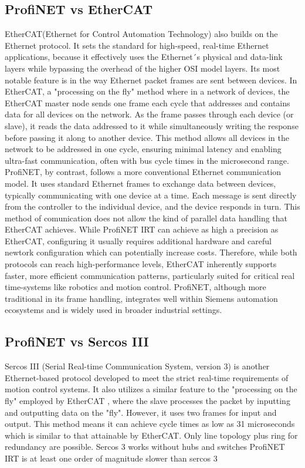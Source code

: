 \documentclass[conference]{IEEEtran}
\begin{document}
\subsection{ProfiNET vs EtherCAT}
EtherCAT(Ethernet for Control Automation Technology) also builds on the Ethernet protocol. It sets the standard for high-speed, real-time Ethernet applications\cite{Rostan2010EtherCAT}, because it effectively uses the Ethernet´s physical and data-link layers while bypassing the overhead of the higher OSI model layers. Its most notable feature is in the way Ethernet packet frames are sent between devices. In EtherCAT, a "processing on the fly" method where in a network of devices, the EtherCAT master node sends one frame each cycle that addresses and contains data for all devices on the network. As the frame passes through each device (or slave), it reads the data addressed to it while simultaneously writing the response before passing it along to another device\cite{DewesoftEtherCAT2023}. This method allows all devices in the network to be addressed in one cycle, ensuring minimal latency and enabling ultra-fast communication, often with bus cycle times in the microsecond range\cite{Rostan2010EtherCAT}.
ProfiNET, by contrast, follows a more conventional Ethernet communication model. It uses standard Ethernet frames to exchange data between devices, typically communicating with one device at a time. Each message is sent directly from the controller to the individual device, and the device responds in turn. This method of comunication does not allow the kind of parallel data handling that EtherCAT achieves. While ProfiNET IRT can achieve as high a precision as EtherCAT, configuring it usually requires additional hardware and careful newtork configuration \cite{WuXie2019} which can potentially increase costs.
Therefore, while both protocols can reach high-performance levels, EtherCAT inherently supports faster, more efficient communication patterns, particularly suited for critical real time-systems like robotics and motion control\cite{BeckhoffETG2023}. ProfiNET, although more traditional in its frame handling, integrates well within Siemens automation ecosystems and is widely used in broader industrial settings\cite{Eitel2020EtherNetVsPROFINET}.

\subsection{ProfiNET vs Sercos III}
Sercos III (Serial Real-time Communication System, version 3) is another Ethernet-based protocol developed to meet the strict real-time requirements of motion control systems. It also utilizes a similar feature to the "processing on the fly" employed by EtherCAT , where the slave processes the packet by inputting and outputting data on the "fly". However, it uses two frames for input and output. This method means it can achieve cycle times as low as 31 microseconds which is similar to that attainable by EtherCAT.
Only line topology plus ring for redundancy are possible. Sercos 3 works without hubs and switches
ProfiNET IRT is at least one order of magnitude slower than sercos 3
\end{document}
